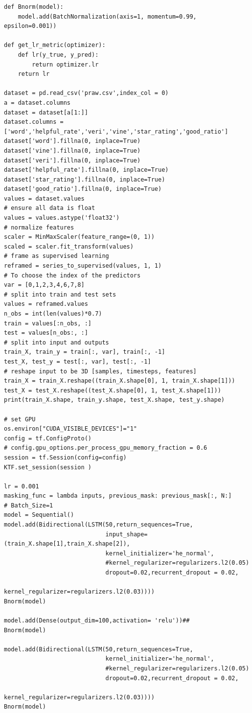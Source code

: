 \documentclass[12pt]{article}
\begin{document}
\begin{appendices}
\begin{lstlisting}
def Bnorm(model):
    model.add(BatchNormalization(axis=1, momentum=0.99, epsilon=0.001))

def get_lr_metric(optimizer):
    def lr(y_true, y_pred):
        return optimizer.lr
    return lr

dataset = pd.read_csv('praw.csv',index_col = 0)
a = dataset.columns
dataset = dataset[a[1:]]
dataset.columns = ['word','helpful_rate','veri','vine','star_rating','good_ratio']
dataset['word'].fillna(0, inplace=True)
dataset['vine'].fillna(0, inplace=True)
dataset['veri'].fillna(0, inplace=True)
dataset['helpful_rate'].fillna(0, inplace=True)
dataset['star_rating'].fillna(0, inplace=True)
dataset['good_ratio'].fillna(0, inplace=True)
values = dataset.values
# ensure all data is float
values = values.astype('float32')
# normalize features
scaler = MinMaxScaler(feature_range=(0, 1))
scaled = scaler.fit_transform(values)
# frame as supervised learning
reframed = series_to_supervised(values, 1, 1)
# To choose the index of the predictors
var = [0,1,2,3,4,6,7,8]
# split into train and test sets
values = reframed.values
n_obs = int(len(values)*0.7)
train = values[:n_obs, :]
test = values[n_obs:, :]
# split into input and outputs
train_X, train_y = train[:, var], train[:, -1]
test_X, test_y = test[:, var], test[:, -1]
# reshape input to be 3D [samples, timesteps, features]
train_X = train_X.reshape((train_X.shape[0], 1, train_X.shape[1]))
test_X = test_X.reshape((test_X.shape[0], 1, test_X.shape[1]))
print(train_X.shape, train_y.shape, test_X.shape, test_y.shape)

# set GPU
os.environ["CUDA_VISIBLE_DEVICES"]="1"
config = tf.ConfigProto()
# config.gpu_options.per_process_gpu_memory_fraction = 0.6 
session = tf.Session(config=config)
KTF.set_session(session )

lr = 0.001
masking_func = lambda inputs, previous_mask: previous_mask[:, N:]
# Batch_Size=1
model = Sequential()
model.add(Bidirectional(LSTM(50,return_sequences=True,
                             input_shape=(train_X.shape[1],train_X.shape[2]),
                             kernel_initializer='he_normal',
                             #kernel_regularizer=regularizers.l2(0.05)
                             dropout=0.02,recurrent_dropout = 0.02,
                             kernel_regularizer=regularizers.l2(0.03))))
Bnorm(model)

model.add(Dense(output_dim=100,activation= 'relu'))##
Bnorm(model)

model.add(Bidirectional(LSTM(50,return_sequences=True,
                             kernel_initializer='he_normal',
                             #kernel_regularizer=regularizers.l2(0.05)
                             dropout=0.02,recurrent_dropout = 0.02,
                            kernel_regularizer=regularizers.l2(0.03))))                           
Bnorm(model)



\end{lstlisting}
\end{appendices}
\end{document}
